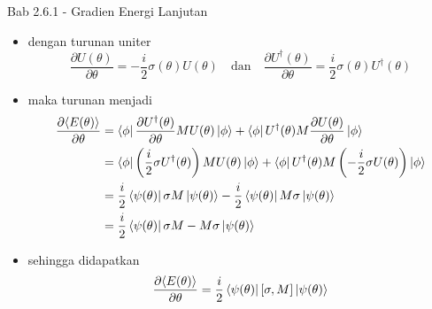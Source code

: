 \begin{frame}{Bab 2.6.1 - Gradien Energi Lanjutan}
    \begin{itemize}
        \item dengan turunan uniter
        \begin{equation*}
            \frac{\partial U(\theta)}{\partial\theta} = -\frac{i}{2}\sigma(\theta) U(\theta) \quad \text{dan} \quad \frac{\partial U^\dagger(\theta)}{\partial\theta} = \frac{i}{2}\sigma(\theta) U^\dagger(\theta)
        \end{equation*}
    \item maka turunan menjadi 
    {\tiny
    \begin{equation*}
        \begin{split}
        \frac{\partial \langle E(\theta)\rangle}{\partial \theta} &= \bra{\phi} \frac{\partial U^{\dagger}(\theta)}{\partial \theta} M U(\theta) \ket{\phi} + \bra{\phi} U^{\dagger}(\theta) M \frac{\partial U(\theta)}{\partial \theta} \ket{\phi} \\
        &= \bra{\phi} \left(\frac{i}{2}\sigma U^{\dagger}(\theta)\right) M U(\theta) \ket{\phi} + \bra{\phi} U^{\dagger}(\theta) M \left(-\frac{i}{2}\sigma U(\theta)\right) \ket{\phi} \\
        &= \frac{i}{2} \bra{\psi(\theta)} \sigma M \ket{\psi(\theta)} - \frac{i}{2} \bra{\psi(\theta)} M \sigma \ket{\psi(\theta)} \\
            &= \frac{i}{2} \bra{\psi(\theta)} \sigma M - M \sigma \ket{\psi(\theta)}
        \end{split}
    \end{equation*}
    }
    \item sehingga didapatkan
        \begin{equation}
        \frac{\partial \langle E(\theta)\rangle}{\partial \theta} = \frac{i}{2} \bra{\psi(\theta)} [\sigma, M] \ket{\psi(\theta)}
        \end{equation}
\end{itemize}
\end{frame}

